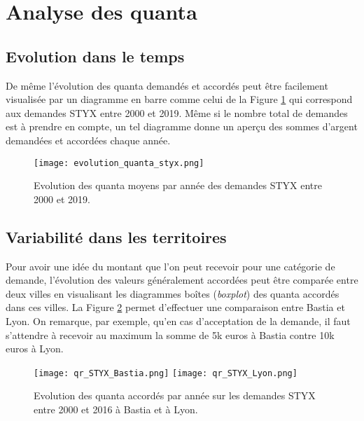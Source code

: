 \section{Analyse des quanta}
\subsection{Evolution dans le temps}
De même l'évolution des quanta demandés et accordés peut être facilement visualisée par un diagramme en barre comme celui de la Figure \ref{fig:demo:evolution-quanta-styx} qui correspond aux demandes STYX entre 2000  et 2019. Même si le nombre total de demandes est à prendre en compte, un tel diagramme donne un aperçu des sommes d'argent demandées et accordées chaque année. 

\begin{figure}[!htb]
	\centering 
	\texttt{[image: evolution\_quanta\_styx.png]}
	\caption{Evolution des quanta moyens par année des demandes STYX entre  2000  et 2019.}\label{fig:demo:evolution-quanta-styx}
\end{figure}


\subsection{Variabilité dans les territoires}

Pour avoir une idée du montant que l'on peut recevoir pour une catégorie de demande, l'évolution des valeurs généralement accordées peut être comparée entre deux villes en visualisant les diagrammes boîtes (\textit{boxplot}) 
des quanta accordés dans ces villes. La Figure \ref{fig:demo:evolution-qr-styx-compare-ville} permet d'effectuer une comparaison entre Bastia et Lyon. On remarque, par exemple, qu'en cas d'acceptation de la demande, il faut s'attendre à recevoir au maximum la somme de 5k euros à Bastia contre 10k euros à Lyon.

\begin{figure}[!htb]
	\centering 
	\texttt{[image: qr\_STYX\_Bastia.png]}
	\texttt{[image: qr\_STYX\_Lyon.png]}
	\caption{Evolution des quanta accordés par année sur les demandes STYX entre 2000 et 2016 à Bastia et à Lyon.}\label{fig:demo:evolution-qr-styx-compare-ville}
\end{figure}


